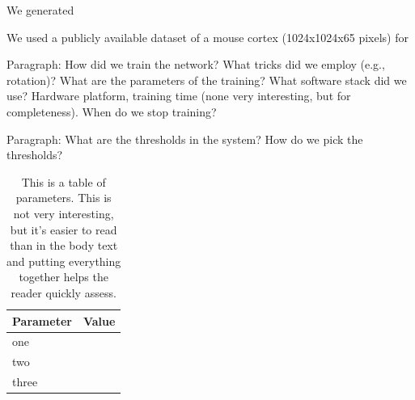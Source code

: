 We generated 

We used a publicly available dataset of a mouse cortex (1024x1024x65 pixels) for 

Paragraph: How did we train the network? What tricks did we employ (e.g., rotation)? What are the parameters of the training? What software stack did we use? Hardware platform, training time (none very interesting, but for completeness). When do we stop training?



Paragraph: What are the thresholds in the system? How do we pick the thresholds?


\begin{table}
\begin{tabular}{ll}
\toprule
Parameter & Value \\
\midrule
one & \\
two & \\
three & \\
\bottomrule
\end{tabular}
\caption{This is a table of parameters. This is not very interesting, but it's easier to read than in the body text and putting everything together helps the reader quickly assess.}
\end{table}